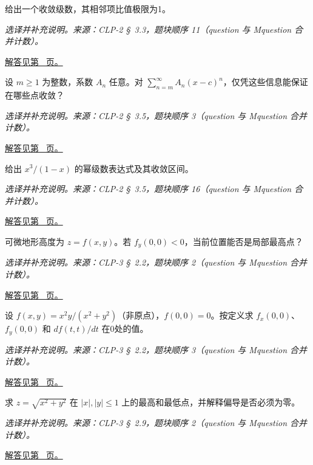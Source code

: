 \documentclass[UTF8,12pt,a4paper,fontset=fandol]{ctexart}
\begin{document}
\begin{example}[比值判别无结论的收敛例子]\label{ex:c45q12}
给出一个收敛级数，其相邻项比值极限为1。
\par\textit{选译并补充说明。来源：CLP-2 \S~3.3，题块顺序 11（question 与 Mquestion 合并计数）。}\par\hyperref[ans:c45q12]{解答见第~\pageref{ans:c45q12} 页。}
\end{example}
\begin{example}[幂级数一定收敛的点]\label{ex:c45q13}
设 $m\ge1$ 为整数，系数 $A_n$ 任意。对 $\sum_{n=m}^\infty A_n(x-c)^n$，仅凭这些信息能保证在哪些点收敛？
\par\textit{选译并补充说明。来源：CLP-2 \S~3.5，题块顺序 3（question 与 Mquestion 合并计数）。}\par\hyperref[ans:c45q13]{解答见第~\pageref{ans:c45q13} 页。}
\end{example}
\begin{example}[几何级数乘幂]\label{ex:c45q14}
给出 $x^3/(1-x)$ 的幂级数表达式及其收敛区间。
\par\textit{选译并补充说明。来源：CLP-2 \S~3.5，题块顺序 16（question 与 Mquestion 合并计数）。}\par\hyperref[ans:c45q14]{解答见第~\pageref{ans:c45q14} 页。}
\end{example}
\begin{example}[非零偏导与山顶]\label{ex:c45q15}
可微地形高度为 $z=f(x,y)$。若 $f_y(0,0)<0$，当前位置能否是局部最高点？
\par\textit{选译并补充说明。来源：CLP-3 \S~2.2，题块顺序 2（question 与 Mquestion 合并计数）。}\par\hyperref[ans:c45q15]{解答见第~\pageref{ans:c45q15} 页。}
\end{example}
\begin{example}[偏导数不能冒充全方向链式法则]\label{ex:c45q16}
设 $f(x,y)=x^2y/(x^2+y^2)$（非原点），$f(0,0)=0$。按定义求 $f_x(0,0)$、$f_y(0,0)$ 和 $d f(t,t)/dt$ 在0处的值。
\par\textit{选译并补充说明。来源：CLP-3 \S~2.2，题块顺序 3（question 与 Mquestion 合并计数）。}\par\hyperref[ans:c45q16]{解答见第~\pageref{ans:c45q16} 页。}
\end{example}
\begin{example}[圆锥面在正方形上的最值]\label{ex:c45q17}
求 $z=\sqrt{x^2+y^2}$ 在 $|x|,|y|\le1$ 上的最高和最低点，并解释偏导是否必须为零。
\par\textit{选译并补充说明。来源：CLP-3 \S~2.9，题块顺序 2（question 与 Mquestion 合并计数）。}\par\hyperref[ans:c45q17]{解答见第~\pageref{ans:c45q17} 页。}
\end{example}
\end{document}
